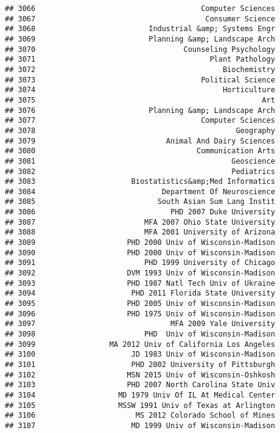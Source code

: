 \documentclass[
]{article}
\begin{document}
\begin{verbatim}
## 3066                                      Computer Sciences
## 3067                                       Consumer Science
## 3068                          Industrial &amp; Systems Engr
## 3069                          Planning &amp; Landscape Arch
## 3070                                  Counseling Psychology
## 3071                                        Plant Pathology
## 3072                                           Biochemistry
## 3073                                      Political Science
## 3074                                           Horticulture
## 3075                                                    Art
## 3076                          Planning &amp; Landscape Arch
## 3077                                      Computer Sciences
## 3078                                              Geography
## 3079                              Animal And Dairy Sciences
## 3080                                     Communication Arts
## 3081                                             Geoscience
## 3082                                             Pediatrics
## 3083                      Biostatistics&amp;Med Informatics
## 3084                             Department Of Neuroscience
## 3085                            South Asian Sum Lang Instit
## 3086                               PHD 2007 Duke University
## 3087                         MFA 2007 Ohio State University
## 3088                         MFA 2001 University of Arizona
## 3089                     PHD 2000 Univ of Wisconsin-Madison
## 3090                     PHD 2000 Univ of Wisconsin-Madison
## 3091                         PHD 1999 University of Chicago
## 3092                     DVM 1993 Univ of Wisconsin-Madison
## 3093                     PHD 1987 Natl Tech Univ of Ukraine
## 3094                      PHD 2011 Florida State University
## 3095                     PHD 2005 Univ of Wisconsin-Madison
## 3096                     PHD 1975 Univ of Wisconsin-Madison
## 3097                               MFA 2009 Yale University
## 3098                         PHD  Univ of Wisconsin-Madison
## 3099                 MA 2012 Univ of California Los Angeles
## 3100                      JD 1983 Univ of Wisconsin-Madison
## 3101                      PHD 2002 University of Pittsburgh
## 3102                     MSN 2015 Univ of Wisconsin-Oshkosh
## 3103                     PHD 2007 North Carolina State Univ
## 3104                   MD 1979 Univ Of IL At Medical Center
## 3105                   MSSW 1991 Univ of Texas at Arlington
## 3106                       MS 2012 Colorado School of Mines
## 3107                      MD 1999 Univ of Wisconsin-Madison

\end{verbatim}
\end{document}
